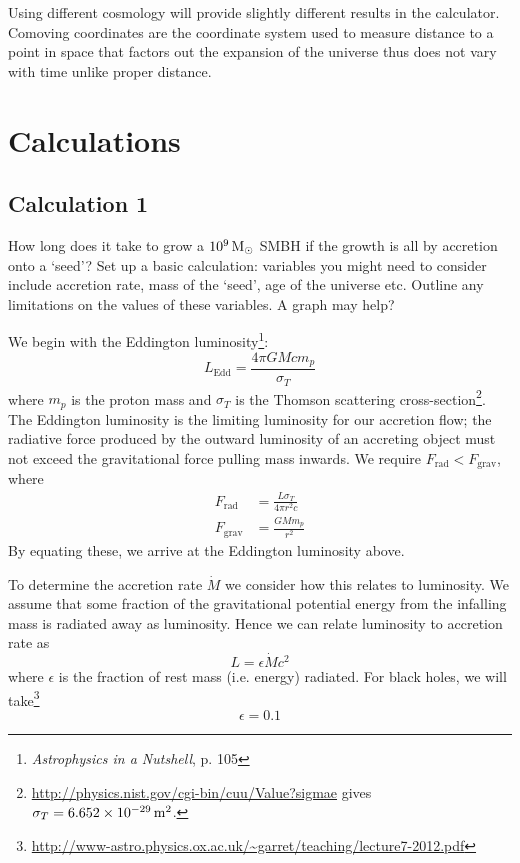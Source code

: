 \documentclass[a4paper]{article} %
\newcommand{\ms}[1]{\SI{#1}{M_{\odot}}}
\begin{document}
Using different cosmology will provide slightly different results in the calculator. Comoving coordinates are the coordinate system used to measure distance to a point in space that factors out the expansion of the universe thus does not vary with time unlike proper distance. 


\section{Calculations}

\subsection{Calculation 1}
\begin{framed}
How long does it take to grow a $\ms{d9}$ SMBH if the growth is all by accretion onto a `seed'? Set up a basic calculation: variables you might need to consider include accretion rate, mass of the `seed', age of the universe etc. Outline any limitations on the values of these variables. A graph may help?
\end{framed}

We begin with the Eddington luminosity\footnote{\emph{Astrophysics in a Nutshell}, p. 105}:
\begin{equation}
L_{\text{Edd}}=\frac{4\pi GMcm_p}{\sigma_{T}}
\end{equation}
where $m_p$ is the proton mass and $\sigma_T$ is the Thomson scattering cross-section\footnote{\url{http://physics.nist.gov/cgi-bin/cuu/Value?sigmae} gives $\sigma_T=\SI{6.652d-29}{m^2}$.}. The Eddington luminosity is the limiting luminosity for our accretion flow; the radiative force produced by the outward luminosity of an accreting object must not exceed the gravitational force pulling mass inwards. We require $F_{\text{rad}}<F_{\text{grav}}$, where
\begin{align}
F_{\text{rad}}&=\frac{L\sigma_T}{4\pi r^2 c}\\
F_{\text{grav}}&=\frac{GMm_p}{r^2}
\end{align}
By equating these, we arrive at the Eddington luminosity above.

To determine the accretion rate $\dot{M}$ we consider how this relates to luminosity. We assume that some fraction of the gravitational potential energy from the infalling mass is radiated away as luminosity. Hence we can relate luminosity to accretion rate as
\begin{equation}
L=\epsilon \dot{M}c^2
\end{equation}
where $\epsilon$ is the fraction of rest mass (i.e. energy) radiated. For black holes, we will take\footnote{\url{http://www-astro.physics.ox.ac.uk/~garret/teaching/lecture7-2012.pdf}}
\begin{equation}
\epsilon =0.1
\end{equation}
\end{document}
